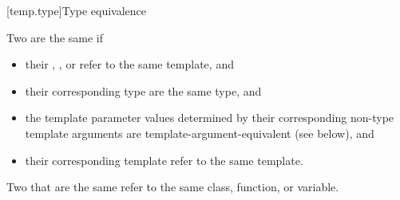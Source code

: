 [temp.type]{Type equivalence}

\pnum
{}%
Two  are the same if
\begin{itemize}
\item
their ,
, or
refer to the same template, and

\item
their corresponding type 
are the same type, and

\item
the template parameter values determined by
their corresponding non-type template arguments
are template-argument-equivalent (see below), and

\item
their corresponding template 
refer to the same template.
\end{itemize}
Two  that are the same
refer to the same class, function, or variable.

